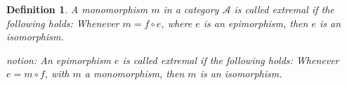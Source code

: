 \documentclass[12pt]{article}
\newcommand{\Cat}[1]{\mathcal{#1}}
\newtheorem{DEF}{Definition}
\begin{document}
\begin{DEF}
A monomorphism $m$ in a category $\Cat A$ is called \emph{extremal} if the following holds: Whenever $m=f\circ e$, where $e$ is
an epimorphism, then $e$ is an isomorphism.

 notion: An epimorphism $e$ is called \emph{extremal} if the following holds: Whenever $e=m\circ f$,
with $m$ a monomorphism, then $m$ is an isomorphism.
\end{DEF}

\end{document}
